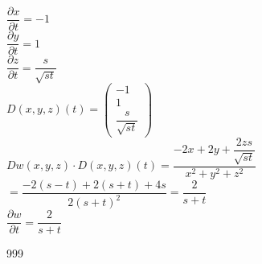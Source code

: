 \documentclass[a4paper]{article}
\begin{document}
$\dfrac{\partial x}{\partial t} = -1$\\

$\dfrac{\partial y}{\partial t} = 1$\\

$\dfrac{\partial z}{\partial t} = \dfrac{s}{\sqrt{st}}$\\

$D(x,y,z)(t)=\left(\begin{array}{c}
-1 \\
1 \\
\dfrac{s}{\sqrt{st}}
\end{array}\right)$\\

$Dw(x,y,z)\cdot D(x,y,z)(t) = \dfrac{-2x+2y+\dfrac{2zs}{\sqrt{st}}}{x^2+y^2+z^2}$\\

$= \dfrac{-2(s-t)+2(s+t)+4s}{2(s+t)^2} = \dfrac{2}{s+t}$\\

$\dfrac{\partial w}{\partial t} = \dfrac{2}{s+t}$\\

\begin{thebibliography}{999}
\end{thebibliography}
\end{document}
